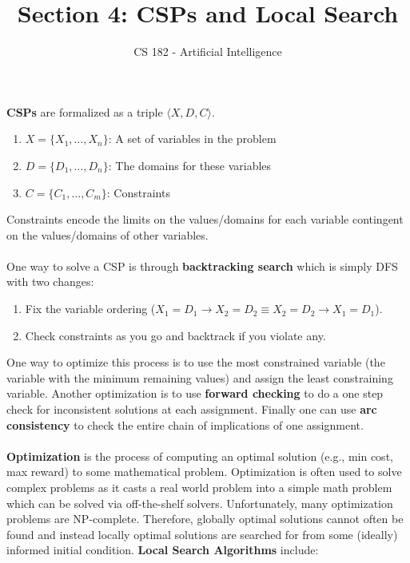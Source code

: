 \documentclass[a4paper]{article}
\title{Section 4: CSPs and Local Search}
\author{CS 182 - Artificial Intelligence}
\date{}
\begin{document}
\maketitle

\noindent \textbf{CSPs} are formalized as a triple $\langle X,D,C \rangle$. 
\begin{enumerate}
\item $X = \{X_1, \ldots, X_n\}$: A set of variables in the problem
\item $D = \{D_1, \ldots, D_n\}$: The domains for these variables
\item $C = \{C_1, \ldots, C_m\}$: Constraints
\end{enumerate}
Constraints encode the limits on the values/domains for each variable contingent on the values/domains of other variables.
\\ \\
\noindent One way to solve a CSP is through \textbf{backtracking search} which is simply DFS with two changes:
\begin{enumerate}
\item Fix the variable ordering ($X_1 = D_1 \rightarrow X_2 = D_2 \equiv X_2 = D_2 \rightarrow X_1 = D_1$).
\item Check constraints as you go and backtrack if you violate any.
\end{enumerate}
One way to optimize this process is to use the most constrained variable (the variable with the minimum remaining values) and assign the least constraining variable. Another optimization is to use \textbf{forward checking} to do a one step check for inconsistent solutions at each assignment. Finally one can use \textbf{arc consistency} to check the entire chain of implications of one assignment.
\\ \\
\noindent \textbf{Optimization} is the process of computing an optimal solution (e.g., min cost, max reward) to some mathematical problem. Optimization is often used to solve complex problems as it casts a real world problem into a simple math problem which can be solved via off-the-shelf solvers. Unfortunately, many optimization problems are NP-complete. Therefore, globally optimal solutions cannot often be found and instead locally optimal solutions are searched for from some (ideally) informed initial condition. \textbf{Local Search Algorithms} include:
\end{document}

